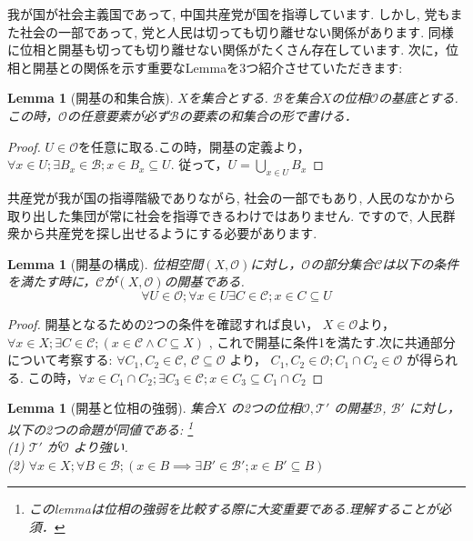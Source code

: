 \documentclass[lualatex]{ltjsbook}
\newtheorem{lemma}[theorem]{Lemma}
\theoremstyle{remark}
\theoremstyle{plain}
\begin{document}
我が国が社会主義国であって, 中国共産党が国を指導しています. しかし, 党もまた社会の一部であって, 党と人民は切っても切り離せない関係があります. 同様に位相と開基も切っても切り離せない関係がたくさん存在しています.
次に，位相と開基との関係を示す重要なLemmaを3つ紹介させていただきます:

\begin{lemma}[開基の和集合族]
	$X$を集合とする. $\mathcal{B}$を集合$X$の位相$\mathcal{O}$の基底とする.この時，$\mathcal{O}$の任意要素が必ず$\mathcal{B}$の要素の和集合の形で書ける．
\end{lemma}

\begin{proof}
	$U\in \mathcal{O}$を任意に取る.この時，開基の定義より，$\forall x \in U ; \exists B_x \in \mathcal{B}; x \in B_x \subseteq U.$ 従って，$U=\bigcup_{x \in U}B_x$
\end{proof}




共産党が我が国の指導階級でありながら, 社会の一部でもあり, 人民のなかから取り出した集団が常に社会を指導できるわけではありません. ですので, 人民群衆から共産党を探し出せるようにする必要があります.

\begin{lemma}[開基の構成]\label{lem:1od}
	位相空間$(X,\mathcal{O})$に対し，$\mathcal{O}$の部分集合$\mathcal{C}$は以下の条件を満たす時に，$\mathcal{C}$が$(X,\mathcal{O})$の開基である.
	$$\forall U \in \mathcal{O};\forall x \in U \exists C \in \mathcal{C}; x \in C \subseteq U$$
\end{lemma}

\begin{proof}
	開基となるための2つの条件を確認すれば良い，
	$X \in \mathcal{O}$より，
	$\forall x \in X; \exists C \in \mathcal{C}; \left( x \in \mathcal{C} \land C \subseteq X  \right)  $ ,
	これで開基に条件1を満たす.次に共通部分について考察する: 
	$\forall C_1 , C_2  \in \mathcal{C} $,
	$ \mathcal{C} \subseteq \mathcal{O}$ より，
	$C_1 , C_2 \in \mathcal{O}; C_1 \cap C_2 \in \mathcal{O}$ が得られる.
	この時，$\forall x \in C_1 \cap C_2; \exists C_3 \in \mathcal{C} ; x \in C_3 \subseteq C_1 \cap C_2$
\end{proof}






\begin{lemma}[開基と位相の強弱]
	集合$X$ の2つの位相$\mathcal{O} , \mathcal{T'}$ の開基$ \mathcal{B}$, $ \mathcal{B'}$ に対し，
	以下の2つの命題が同値である: \footnote{このlemmaは位相の強弱を比較する際に大変重要である.理解することが必須．}\\
	(1) $\mathcal{T'}$ が$\mathcal{O}$ より強い.\\
	(2) $\forall x \in X; \forall B \in \mathcal{B} ; \left( x \in B \implies  \exists B' \in  \mathcal{B'} ; x \in B' \subseteq B \right) $
\end{lemma}
\end{document}
